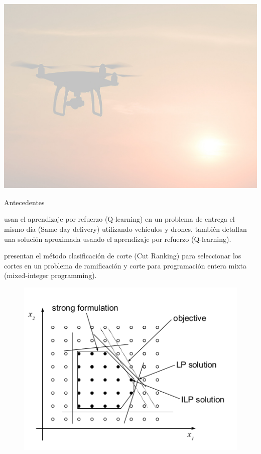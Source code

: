 \documentclass{beamer}
\begin{document}
{
{
    \includegraphics[width=\paperwidth,height=\paperheight]{imagen7.jpeg}
}
\begin{frame}{Antecedentes}

    {\centering \color{black} \citet{CHEN2022939} usan el aprendizaje por refuerzo (Q-learning) en un problema de entrega el mismo día (Same-day delivery) utilizando vehículos y drones, también detallan una solución aproximada usando el aprendizaje por refuerzo (Q-learning). }

\end{frame}
}

\begin{frame}{}
\centering  \cite{HUANG2022108353} presentan el método clasificación de corte (Cut Ranking) para seleccionar los cortes en un problema de ramificación y corte para programación entera mixta (mixed-integer programming).

\begin{figure}
	\centering
	\includegraphics[scale = 0.4]{MIP}
\end{figure}

\end{frame}
\end{document}
